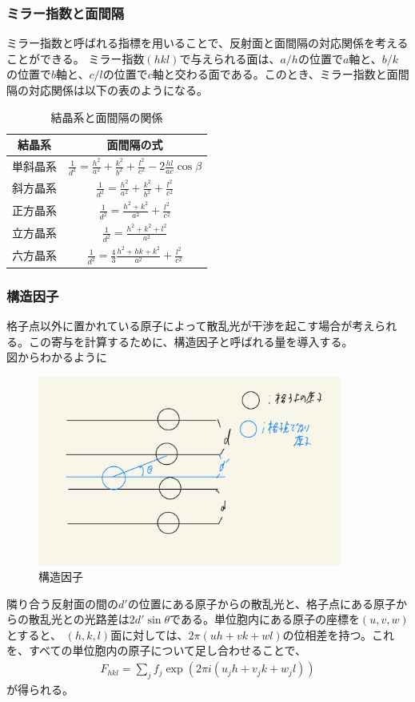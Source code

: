 \documentclass[a4paper,11pt]{jsarticle}
\begin{document}
\subsubsection{ミラー指数と面間隔}
ミラー指数と呼ばれる指標を用いることで、反射面と面間隔の対応関係を考えることができる。
ミラー指数$(hkl)$で与えられる面は、$a/h$の位置で$a$軸と、$b/k$の位置で$b$軸と、$c/l$の位置で$c$軸と交わる面である。このとき、ミラー指数と面間隔の対応関係は以下の表のようになる。
\begin{table}[H]
  \centering
  \begin{tabular}{|c|c|}
    \hline
    結晶系 & 面間隔の式 \\ \hline
    単斜晶系 & $\frac{1}{d^2} = \frac{h^2}{a^2} + \frac{k^2}{b^2} + \frac{l^2}{c^2} - 2\frac{hl}{ac}\cos\beta$ \\ \hline
    斜方晶系 & $\frac{1}{d^2} = \frac{h^2}{a^2} + \frac{k^2}{b^2} + \frac{l^2}{c^2}$ \\ \hline
    正方晶系 & $\frac{1}{d^2} = \frac{h^2 + k^2}{a^2} + \frac{l^2}{c^2}$ \\ \hline
    立方晶系 & $\frac{1}{d^2} = \frac{h^2 + k^2 + l^2}{a^2}$ \\ \hline
    六方晶系 & $\frac{1}{d^2} = \frac{4}{3}\frac{h^2 + hk + k^2}{a^2} + \frac{l^2}{c^2}$ \\ \hline
  \end{tabular}
  \caption{結晶系と面間隔の関係}
  \label{tab:crystal_systems}
\end{table}

\subsubsection{構造因子}
格子点以外に置かれている原子によって散乱光が干渉を起こす場合が考えられる。この寄与を計算するために、構造因子と呼ばれる量を導入する。\\
図からわかるように
\begin{figure}[H]
    \begin{center}
    \includegraphics[width=100mm]{image.jpg}
    \end{center}
    \caption{構造因子}
    \label{fig:structure}
\end{figure}
隣り合う反射面の間の$d'$の位置にある原子からの散乱光と、格子点にある原子からの散乱光との光路差は$2d'\sin\theta$である。単位胞内にある原子の座標を$(u,v,w)$とすると、
$(h,k,l)$面に対しては、$2\pi(uh + vk + wl)$の位相差を持つ。これを、すべての単位胞内の原子について足し合わせることで、
\begin{align}
  F_{hkl} = \sum_{j}f_j\exp(2\pi i(u_jh + v_jk + w_jl))
\end{align}
が得られる。
\end{document}
